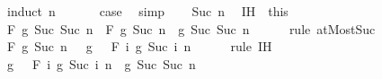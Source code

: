 \begin{isabellebody}
\endisadelimproof
%
\isatagproof
{}\isamarkupfalse%
\ {\isacharparenleft}{\kern0pt}induct\ n{\isacharparenright}{\kern0pt}\isanewline
\ \ \isamarkupfalse%
\ {}\ \isamarkupfalse%
\ {\isacharquery}{\kern0pt}case\ \isamarkupfalse%
\ simp\isanewline
{}\isamarkupfalse%
\isanewline
\ \ \isamarkupfalse%
\ {\isacharparenleft}{\kern0pt}Suc\ n{\isacharparenright}{\kern0pt}\ \isamarkupfalse%
\ IH\ {\isacharequal}{\kern0pt}\ this\isanewline
\ \ \isamarkupfalse%
\ {\isachardoublequoteopen}F\ g\ {\isacharbraceleft}{\kern0pt}{\isachardot}{\kern0pt}{\isachardot}{\kern0pt}Suc\ {\isacharparenleft}{\kern0pt}Suc\ n{\isacharparenright}{\kern0pt}{\isacharbraceright}{\kern0pt}\ {\isacharequal}{\kern0pt}\ F\ g\ {\isacharbraceleft}{\kern0pt}{\isachardot}{\kern0pt}{\isachardot}{\kern0pt}Suc\ n{\isacharbraceright}{\kern0pt}\ \isactrlbold {\isacharasterisk}{\kern0pt}\ g\ {\isacharparenleft}{\kern0pt}Suc\ {\isacharparenleft}{\kern0pt}Suc\ n{\isacharparenright}{\kern0pt}{\isacharparenright}{\kern0pt}{\isachardoublequoteclose}\isanewline
\ \ \ \ \isamarkupfalse%
\ {\isacharparenleft}{\kern0pt}rule\ atMost{\isacharunderscore}{\kern0pt}Suc{\isacharparenright}{\kern0pt}\isanewline
\ \ \isamarkupfalse%
\ \isamarkupfalse%
\ {\isachardoublequoteopen}F\ g\ {\isacharbraceleft}{\kern0pt}{\isachardot}{\kern0pt}{\isachardot}{\kern0pt}Suc\ n{\isacharbraceright}{\kern0pt}\ \ {\isacharequal}{\kern0pt}\ g\ {}\ \isactrlbold {\isacharasterisk}{\kern0pt}\ F\ {\isacharparenleft}{\kern0pt}{\isasymlambda}i{\isachardot}{\kern0pt}\ g\ {\isacharparenleft}{\kern0pt}Suc\ i{\isacharparenright}{\kern0pt}{\isacharparenright}{\kern0pt}\ {\isacharbraceleft}{\kern0pt}{\isachardot}{\kern0pt}{\isachardot}{\kern0pt}n{\isacharbraceright}{\kern0pt}{\isachardoublequoteclose}\isanewline
\ \ \ \ \isamarkupfalse%
\ {\isacharparenleft}{\kern0pt}rule\ IH{\isacharparenright}{\kern0pt}\isanewline
\ \ \isamarkupfalse%
\ \isamarkupfalse%
\ {\isachardoublequoteopen}g\ {}\ \isactrlbold {\isacharasterisk}{\kern0pt}\ F\ {\isacharparenleft}{\kern0pt}{\isasymlambda}i{\isachardot}{\kern0pt}\ g\ {\isacharparenleft}{\kern0pt}Suc\ i{\isacharparenright}{\kern0pt}{\isacharparenright}{\kern0pt}\ {\isacharbraceleft}{\kern0pt}{\isachardot}{\kern0pt}{\isachardot}{\kern0pt}n{\isacharbraceright}{\kern0pt}\ \isactrlbold {\isacharasterisk}{\kern0pt}\ g\ {\isacharparenleft}{\kern0pt}Suc\ {\isacharparenleft}{\kern0pt}Suc\ n{\isacharparenright}{\kern0pt}{\isacharparenright}{\kern0pt}\ {\isacharequal}{\kern0pt}\isanewline

\end{isabellebody}
